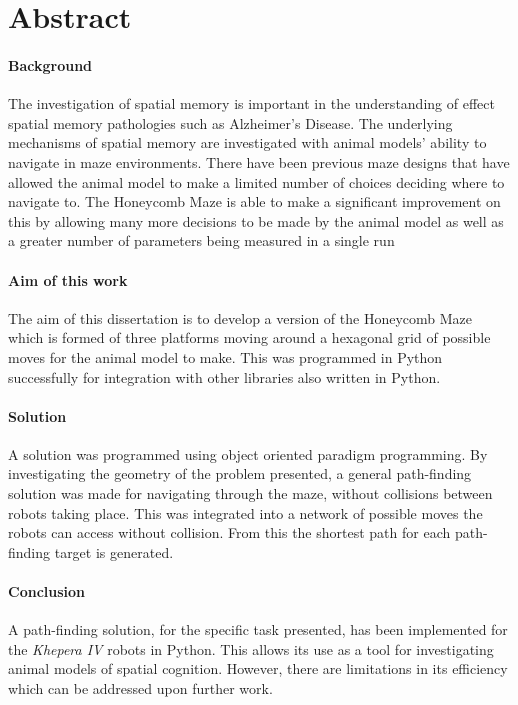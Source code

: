 \section*{Abstract}

\paragraph{Background}
The investigation of spatial memory is important in the understanding of effect spatial memory pathologies such as Alzheimer's Disease. The underlying mechanisms of spatial memory are investigated with animal models' ability to navigate in maze environments. 
There have been previous maze designs that have allowed the animal model to make a limited number of choices deciding where to navigate to. The Honeycomb Maze is able to make a significant improvement on this by allowing many more decisions to be made by the animal model as well as a greater number of parameters being measured in a single run 
\paragraph{Aim of this work}
The aim of this dissertation is to develop a version of the Honeycomb Maze which is formed of three platforms moving around a hexagonal grid of possible moves for the animal model to make. This was programmed in Python successfully for integration with other libraries also written in Python.
\paragraph{Solution}
A solution was programmed using object oriented paradigm programming. By investigating the geometry of the problem presented, a general path-finding solution was made for navigating through the maze, without collisions between robots taking place. This was integrated into a network of possible moves the robots can access without collision. From this the shortest path for each path-finding target is generated.


\paragraph{Conclusion}
A path-finding solution, for the specific task presented, has been implemented for the \textit{Khepera IV} robots in Python. This allows its use as a tool for investigating animal models of spatial cognition. However, there are limitations in its efficiency which can be addressed upon further work.



